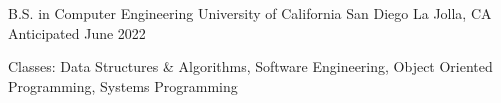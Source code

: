 \begin{cventries}
  \cventry
    {B.S. in Computer Engineering}
    {University of California San Diego}
    {La Jolla, CA}
    {Anticipated June 2022}
    {
      \begin{cvitems}
        \item {Classes: Data Structures \& Algorithms, Software Engineering, Object Oriented Programming, Systems Programming}
      \end{cvitems}
    }
\end{cventries}
